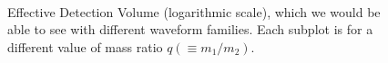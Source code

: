 \documentclass[aps,
prd,
amsmath,
amssymb,
twocolumn,
floatfix,
groupedaddress]{revtex4-1}
\def\l({\left(}
\def\r){\right)}
\begin{document}
\begin{figure}
\\ 
  \caption{Effective Detection Volume (logarithmic scale), which we would be able to see with different waveform families. Each subplot is for a different value of mass ratio $q \l(\equiv m_1/m_2\r)$.}
  \label{fig:VeffsLog}
\end{figure}
\end{document}

